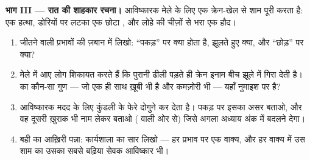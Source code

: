 \begin{problem}[{सप्ताहांत समस्या --- एक बैटरी, तीन प्रभाव, पाँच
आविष्कार; आविष्कारक की कार्यशाला में एक
शाम}]
\medskip\noindent\textbf{भाग III --- रात की शाहकार रचना।}
आविष्कारक मेले के लिए एक क्रेन-खेल से शाम पूरी करता है: एक हत्था,
डोरियों पर लटका एक छोटा , और लोहे की चीज़ों से भरा एक
हौद।
\begin{enumerate}[resume]
  \item जीतने वाली  प्रभावों की ज़बान में लिखो: ``पकड़'' पर क्या
        होता है, झूलते हुए क्या, और ``छोड़'' पर क्या?
  \item मेले में आए लोग शिकायत करते हैं कि पुरानी  ढीली पड़ते ही
        क्रेन इनाम बीच झूले में गिरा देती है।  का कौन-सा
        गुण --- जो एक ही साथ ख़ूबी भी है और कमज़ोरी भी --- यहाँ
        नुमाइश पर है?
  \item आविष्कारक मदद के लिए कुंडली के फेरे दोगुने कर देता है। पकड़ पर
        इसका असर बताओ, और वह दूसरी ख़ुराक भी नाम लेकर बताओ (
        वाली ओर से) जिसे अगला अध्याय अंक में बदलने देगा।
  \item बही का आख़िरी पन्ना: कार्यशाला का सार लिखो --- हर प्रभाव पर
        एक वाक्य, और हर वाक्य में उस शाम का उसका सबसे बढ़िया सेवक
        आविष्कार भी।
\end{enumerate}
\end{problem}
